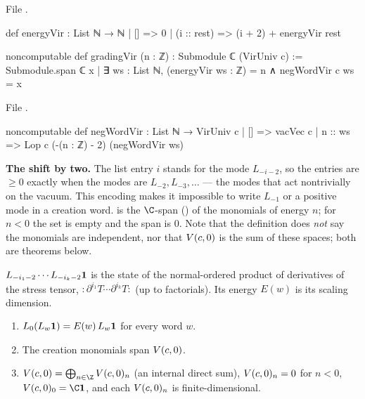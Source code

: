 File .
\begin{leancode}
def energyVir : List ℕ → ℕ
  | [] => 0
  | (i :: rest) => (i + 2) + energyVir rest

noncomputable def gradingVir (n : ℤ) : Submodule ℂ (VirUniv c) :=
  Submodule.span ℂ {x | ∃ ws : List ℕ, (energyVir ws : ℤ) = n ∧ negWordVir c ws = x}
\end{leancode}
File .
\begin{leancode}
noncomputable def negWordVir : List ℕ → VirUniv c
  | [] => vacVec c
  | n :: ws => Lop c (-(n : ℤ) - 2) (negWordVir ws)
\end{leancode}

\begin{dictionary}
\textbf{The shift by two.} The list entry $i$ stands for the mode $L_{-i-2}$, so the entries are
$\ge0$ exactly when the modes are $L_{-2},L_{-3},\dots$ --- the modes that act nontrivially on the
vacuum. This encoding makes it impossible to write $L_{-1}$ or a positive mode in a creation word.
 is the $\C$-span () of the monomials of energy $n$; for
$n<0$ the set is empty and the span is $0$. Note that the definition does \emph{not} say the
monomials are independent, nor that $V(c,0)$ is the sum of these spaces; both are theorems below.
\end{dictionary}

\begin{physics}
$L_{-i_1-2}\cdots L_{-i_k-2}\mathbf{1}$ is the state of the normal-ordered product of derivatives of the
stress tensor, ${:}\partial^{i_1}T\cdots\partial^{i_k}T{:}$ (up to factorials). Its energy $E(w)$ is its
scaling dimension.
\end{physics}

\begin{theorem}\label{l06:thm:grading}
\begin{enumerate}
\item $L_0(L_w\mathbf{1}) = E(w)\,L_w\mathbf{1}$ for every word $w$.
\item The creation monomials span $V(c,0)$.
\item $\lsixV = \bigoplus_{n\in\Z}\lsixV_n$ (an internal direct sum), $V(c,0)_n = 0$ for $n<0$,
  $\lsixV_0 = \C\lsixvac$, and each $V(c,0)_n$ is finite-dimensional.
\end{enumerate}
\end{theorem}

